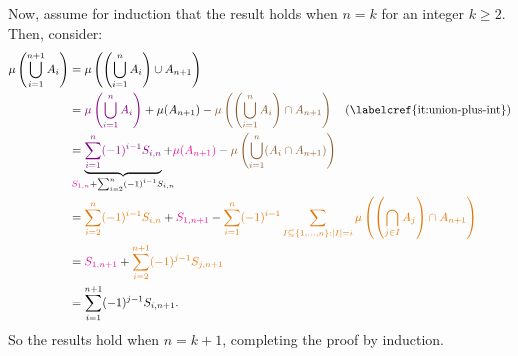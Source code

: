 \begin{enumerate}
\begin{pf}
\begin{enumerate}
Now, assume for induction that the result holds when \(n=k\) for an integer \(k\ge 2\).
Then, consider:
\begin{align*}
\mu\left(\bigcup_{i=1}^{n+1}A_i\right)
&=\mu\left(\left(\bigcup_{i=1}^{n}A_i\right)\cup A_{n+1}\right) \\
&=\vc{\mu\left(\bigcup_{i=1}^{n}A_i\right)}+\mu(A_{n+1})
-\brc{\mu\left(\left(\bigcup_{i=1}^{n}A_i\right)\cap A_{n+1}\right)}\quad\text{(\labelcref{it:union-plus-int})} \\
&=\underbrace{\vc{\sum_{i=1}^{n}(-1)^{i-1}S_{i,n}}}_{\mathclap{\mgc{S_{1,n}}+\sum_{i=2}^{n}(-1)^{i-1}S_{i,n}}}
+\mgc{\mu(A_{n+1})}
-\brc{\mu\left(\bigcup_{i=1}^{n}(A_i\cap A_{n+1})\right)}\\
&=\orc{\sum_{i=2}^{n}(-1)^{i-1}S_{i,n}}+\mgc{S_{1,n+1}}-\orc{\sum_{i=1}^{n}(-1)^{i-1}
\sum_{I\subseteq \{1,\dotsc,n\}:|I|=i}^{}\mu\left(\left(\bigcap_{j\in I}^{}A_j\right)\cap A_{n+1}\right)} \\
&=\mgc{S_{1,n+1}}+\orc{\sum_{i=2}^{n+1}(-1)^{j-1}S_{j,n+1}} \\
&=\sum_{i=1}^{n+1}(-1)^{j-1}S_{i,n+1}.
\end{align*}
So the results hold when \(n=k+1\), completing the proof by induction.


\end{enumerate}
\end{pf}
\end{enumerate}
